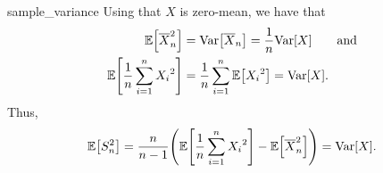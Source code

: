 \section*{}

\begin{solution}{sample_variance}
  Using that $X$ is zero-mean, we have that \begin{align*}
    \E{\mean{X}_n^2} &= \Var{\mean{X}_n} = \frac{1}{n} \Var{X} \qquad\text{and} \\
    \E{\frac{1}{n} \sum_{i=1}^n {X_i}^2} &= \frac{1}{n} \sum_{i=1}^n \E{{X_i}^2} = \Var{X}.
  \end{align*}
  Thus, \begin{align*}
    \E{S_n^2} = \frac{n}{n-1} \parentheses*{\E{\frac{1}{n} \sum_{i=1}^n {X_i}^2} - \E{\mean{X}_n^2}} = \Var{X}.
  \end{align*}
\end{solution}

